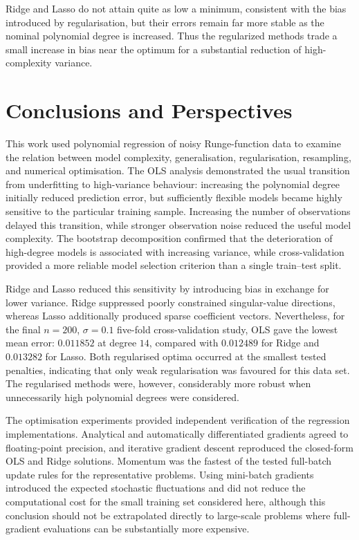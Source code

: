 \documentclass[aps,rmp,reprint,amsmath,amssymb,graphicx,longbibliography]{revtex4-1}
\begin{document}
Ridge and Lasso do not attain quite as low a minimum, consistent
with the bias introduced by regularisation, but their errors remain far more
stable as the nominal polynomial degree is increased. Thus the regularized
methods trade a small increase in bias near the optimum for a substantial
reduction of high-complexity variance.

\FloatBarrier
\section{Conclusions and Perspectives}

This work used polynomial regression of noisy Runge-function data to examine
the relation between model complexity, generalisation, regularisation,
resampling, and numerical optimisation. The OLS analysis demonstrated the
usual transition from underfitting to high-variance behaviour: increasing the
polynomial degree initially reduced prediction error, but sufficiently flexible
models became highly sensitive to the particular training sample. Increasing
the number of observations delayed this transition, while stronger observation
noise reduced the useful model complexity. The bootstrap decomposition
confirmed that the deterioration of high-degree models is associated with
increasing variance, while cross-validation provided a more reliable model
selection criterion than a single train--test split.

Ridge and Lasso reduced this sensitivity by introducing bias in exchange for
lower variance. Ridge suppressed poorly constrained singular-value directions,
whereas Lasso additionally produced sparse coefficient vectors. Nevertheless,
for the final $n=200$, $\sigma=0.1$ five-fold cross-validation study, OLS gave
the lowest mean error: $0.011852$ at degree $14$, compared with $0.012489$ for
Ridge and $0.013282$ for Lasso. Both regularised optima occurred at the
smallest tested penalties, indicating that only weak regularisation was
favoured for this data set. The regularised methods were, however,
considerably more robust when unnecessarily high polynomial degrees were
considered.

The optimisation experiments provided independent verification of the
regression implementations. Analytical and automatically differentiated
gradients agreed to floating-point precision, and iterative gradient descent
reproduced the closed-form OLS and Ridge solutions. Momentum was the fastest
of the tested full-batch update rules for the representative problems. Using
mini-batch gradients introduced the expected stochastic fluctuations and did
not reduce the computational cost for the small training set considered here,
although this conclusion should not be extrapolated directly to large-scale
problems where full-gradient evaluations can be substantially more expensive.
\end{document}
